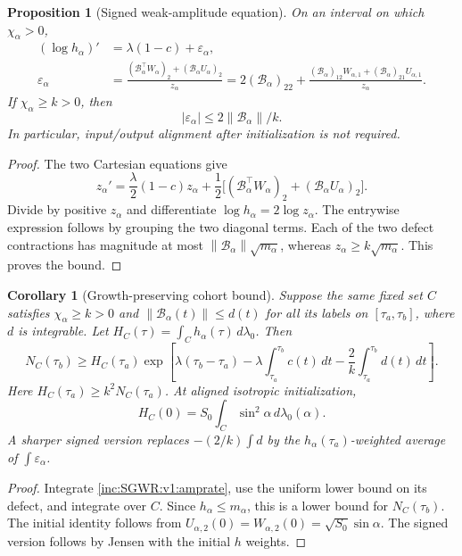\documentclass[11pt]{article}
\numberwithin{equation}{section}
\newtheorem{proposition}[theorem]{Proposition}
\newtheorem{corollary}[theorem]{Corollary}
\theoremstyle{remark}\newtheorem{remark}[theorem]{Remark}
\newcommand{\dd}{\,d}
\newcommand{\norm}[1]{\left\lVert#1\right\rVert}
\newcommand{\1}{\mathbf1}
\begin{document}
\begin{proposition}[Signed weak-amplitude equation]\label{inc:SGWR:v1:ampflow}
On an interval on which $\chi_\alpha>0$,
\begin{align}
 (\log h_\alpha)'&=\lambda(1-c)+\varepsilon_\alpha,
 \label{inc:SGWR:v1:amprate}\\
 \varepsilon_\alpha
 &=\frac{(\mathcal B_\alpha^\top W_\alpha)_2
                    +(\mathcal B_\alpha U_\alpha)_2}{z_\alpha}
 =2(\mathcal B_\alpha)_{22}
 +\frac{(\mathcal B_\alpha)_{12}W_{\alpha,1}
           +(\mathcal B_\alpha)_{21}U_{\alpha,1}}{z_\alpha}.
 \nonumber
\end{align}
If $\chi_\alpha\ge k>0$, then
\begin{equation}\label{inc:SGWR:v1:amperror}
 |\varepsilon_\alpha|\le 2\norm{\mathcal B_\alpha}/k.
\end{equation}
In particular, input/output alignment after initialization is not required.
\end{proposition}
\begin{proof}
The two Cartesian equations give
\[
 z_\alpha'=\frac\lambda2(1-c)z_\alpha
 +\frac12\big[(\mathcal B_\alpha^\top W_\alpha)_2
                    +(\mathcal B_\alpha U_\alpha)_2\big].
\]
Divide by positive $z_\alpha$ and differentiate $\log h_\alpha=2\log z_\alpha$.
The entrywise expression follows by grouping the two diagonal terms.
Each of the two defect contractions has magnitude at most
$\norm{\mathcal B_\alpha}\sqrt{m_\alpha}$, whereas
$z_\alpha\ge k\sqrt{m_\alpha}$. This proves the bound.
\end{proof}

\begin{corollary}[Growth-preserving cohort bound]\label{inc:SGWR:v1:ampcohort}
Suppose the same fixed set $C$ satisfies $\chi_\alpha\ge k>0$ and
$\norm{\mathcal B_\alpha(t)}\le d(t)$ for all its labels on
$[\tau_a,\tau_b]$, where $d$ is integrable. Let
$H_C(\tau)=\int_Ch_\alpha(\tau)\dd\lambda_0$.
Then
\begin{equation}\label{inc:SGWR:v1:ampbound}
 \boxed{N_C(\tau_b)\ge H_C(\tau_a)
 \exp\!\left[\lambda(\tau_b-\tau_a)
       -\lambda\int_{\tau_a}^{\tau_b}c(t)\dd t
       -\frac2k\int_{\tau_a}^{\tau_b}d(t)\dd t\right].}
\end{equation}
Here $H_C(\tau_a)\ge k^2N_C(\tau_a)$. At aligned isotropic initialization,
\begin{equation}\label{inc:SGWR:v1:ancestry}
 H_C(0)=S_0\int_C\sin^2\alpha\dd\lambda_0(\alpha).
\end{equation}
A sharper signed version replaces $-(2/k)\int d$ by the
$h_\alpha(\tau_a)$-weighted average of $\int\varepsilon_\alpha$.
\end{corollary}
\begin{proof}
Integrate \eqref{inc:SGWR:v1:amprate}, use the uniform lower bound on its
defect, and integrate over $C$. Since $h_\alpha\le m_\alpha$, this is a
lower bound for $N_C(\tau_b)$. The initial identity follows from
$U_{\alpha,2}(0)=W_{\alpha,2}(0)=\sqrt{S_0}\sin\alpha$.
The signed version follows by Jensen with the initial $h$ weights.
\end{proof}
\end{document}
